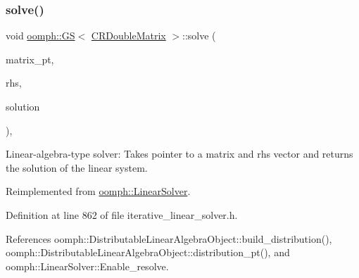 \mbox{\label{classoomph_1_1GS_3_01CRDoubleMatrix_01_4_a357c56a7521b27814d9ab84a3b1e3a75}} 
\subsubsection{\texorpdfstring{solve()}{solve()}\hspace{0.1cm}{\footnotesize\ttfamily [2/3]}}
{\footnotesize\ttfamily void \hyperlink{classoomph_1_1GS}{oomph\+::\+GS}$<$ \hyperlink{classoomph_1_1CRDoubleMatrix}{C\+R\+Double\+Matrix} $>$\+::solve (\begin{DoxyParamCaption}\item[{\hyperlink{classoomph_1_1DoubleMatrixBase}{Double\+Matrix\+Base} $\ast$const \&}]{matrix\+\_\+pt,  }\item[{const \hyperlink{classoomph_1_1DoubleVector}{Double\+Vector} \&}]{rhs,  }\item[{\hyperlink{classoomph_1_1DoubleVector}{Double\+Vector} \&}]{solution }\end{DoxyParamCaption})\hspace{0.3cm}{\ttfamily [inline]}, {\ttfamily [virtual]}}



Linear-\/algebra-\/type solver\+: Takes pointer to a matrix and rhs vector and returns the solution of the linear system. 



Reimplemented from \hyperlink{classoomph_1_1LinearSolver_a546c09822d18191df14caed864c04c09}{oomph\+::\+Linear\+Solver}.



Definition at line 862 of file iterative\+\_\+linear\+\_\+solver.\+h.



References oomph\+::\+Distributable\+Linear\+Algebra\+Object\+::build\+\_\+distribution(), oomph\+::\+Distributable\+Linear\+Algebra\+Object\+::distribution\+\_\+pt(), and oomph\+::\+Linear\+Solver\+::\+Enable\+\_\+resolve.

\mbox{\label{classoomph_1_1GS_3_01CRDoubleMatrix_01_4_a989f4c09b2976a561acb498ba4d85ace}} 
